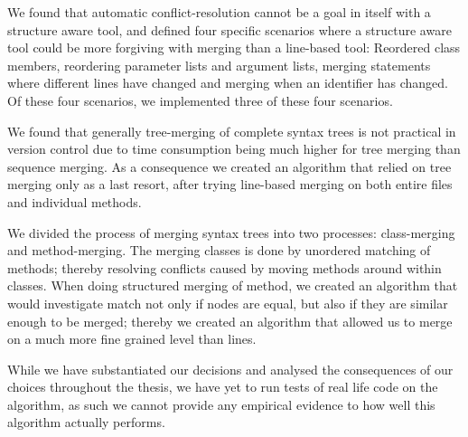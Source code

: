 \documentclass[11pt]{article}
\begin{document}
We found that automatic conflict-resolution cannot be a goal in itself with a structure aware tool, and defined four specific scenarios where a structure aware tool could be more forgiving with merging than a line-based tool: Reordered class members, reordering parameter lists and argument lists, merging statements where different lines have changed and merging when an identifier has changed. Of these four scenarios, we implemented three of these four scenarios.

We found that generally tree-merging of complete syntax trees is not practical in version control due to time consumption being much higher for tree merging than sequence merging. As a consequence we created an algorithm that relied on tree merging only as a last resort, after trying line-based merging on both entire files and individual methods.

We divided the process of merging syntax trees into two processes: class-merging and method-merging. The merging classes is done by unordered matching of methods; thereby resolving conflicts caused by moving methods around within classes. When doing structured merging of method, we created an algorithm that would investigate match not only if nodes are equal, but also if they are similar enough to be merged; thereby we created an algorithm that allowed us to merge on a much more fine grained level than lines.

While we have substantiated our decisions and analysed the consequences of our choices throughout the thesis, we have yet to run tests of real life code on the algorithm, as such we cannot provide any empirical evidence to how well this algorithm actually performs.

\clearpage

\listofalgorithms

\clearpage



\end{document}
